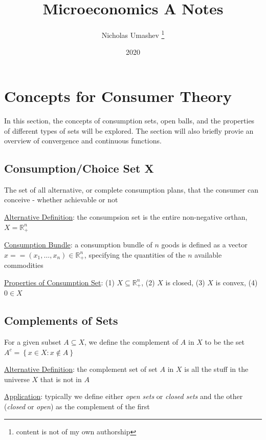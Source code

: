 \documentclass{article}
\title{Microeconomics A Notes}
\author{Nicholas Umashev \footnote{content is not of my own authorship}}
\date{2020}
\begin{document}
\maketitle

\tableofcontents

\newpage

\vspace{2.5mm}
\section{Concepts for Consumer Theory}
In this section, the concepts of consumption sets, open balls, and the properties of different types of sets will be explored. The section will also briefly provie an overview of convergence and continuous functions. \par
\vspace{6mm}
\subsection{Consumption/Choice Set X}
The set of all alternative, or complete consumption plans, that the consumer can conceive - whether achievable or not \par \vspace{0.3em}
  \underline{Alternative Definition}: the consumpsion set is the entire non-negative orthan, $X = \mathbb{R}^{n}_{+}$ \par
  \underline{Consumption Bundle}: a consumption bundle of $n$ goods is defined as a vector $x == (x_{1}, \dots, x_{n}) \in \mathbb{R}_{+}^{n}$, specifying the quantities of the $n$ available commodities \par
  \underline{Properties of Consumption Set}: (1) $X \subseteq \mathbb{R}_{+}^{n}$, (2) $X$ is closed, (3) $X$ is convex, (4) $0 \in X$ \par
\vspace{6mm}
\subsection{Complements of Sets}
For a given subset $A \subseteq X$, we define the complement of $A$ in $X$ to be the set $A^{c} = \left\{ x \in X: x \notin A \right\}$ \par \vspace{0.3em}
  \underline{Alternative Definition}: the complement set of set $A$ in $X$ is all the stuff in the universe $X$ that is not in $A$ \par
  \underline{Application}: typically we define either \textit{open sets} or \textit{closed sets} and the other (\textit{closed} or \textit{open}) as the complement of the first \par
\vspace{6mm}
\end{document}

